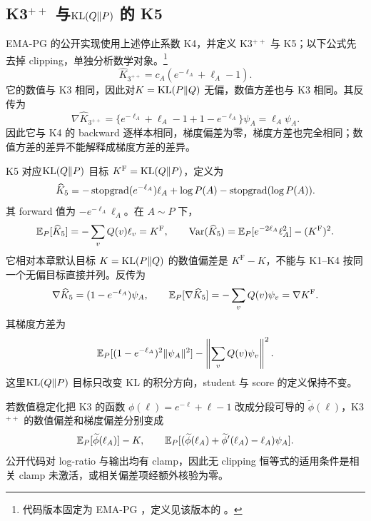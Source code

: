 \subsection{K3$^{++}$ 与$\operatorname{KL}(Q\Vert P)$ 的 K5}

EMA-PG 的公开实现使用上述停止系数 K4，并定义 K3$^{++}$ 与 K5；以下公式先去掉 clipping，单独分析数学对象。\footnote{代码版本固定为 EMA-PG ，定义见该版本的 \href{https://github.com/LunjunZhang/ema-pg/blob/f9b977632ad948ce935432a517c22291bfaba562/search/verl/trainer/ppo/core_algos.py}{}。}
\begin{equation*}
 \widehat K_{3^{++}}=c_A(e^{-\ell_A}+\ell_A-1).
\end{equation*}
它的数值与 K3 相同，因此对$K=\operatorname{KL}(P\Vert Q)$ 无偏，数值方差也与 K3 相同。其反传为
\begin{equation*}
 \nabla\widehat K_{3^{++}}
 =\{e^{-\ell_A}+\ell_A-1+1-e^{-\ell_A}\}\psi_A=\ell_A\psi_A.
\end{equation*}
因此它与 K4 的 backward 逐样本相同，梯度偏差为零，梯度方差也完全相同；数值方差的差异不能解释成梯度方差的差异。

K5 对应$\operatorname{KL}(Q\Vert P)$ 目标 $K^{\mathrm F}=\operatorname{KL}(Q\Vert P)$，定义为
\begin{equation*}
 \widehat K_5=-\operatorname{stopgrad}(e^{-\ell_A})\ell_A+\log P(A)-\operatorname{stopgrad}(\log P(A)).
\end{equation*}
其 forward 值为 $-e^{-\ell_A}\ell_A$。在 $A\sim P$ 下，
\begin{equation*}
 \mathbb E_P[\widehat K_5]=-\sum_vQ(v)\ell_v=K^{\mathrm F},\qquad
 \operatorname{Var}(\widehat K_5)=\mathbb E_P[e^{-2\ell_A}\ell_A^2]-(K^{\mathrm F})^2.
\end{equation*}
它相对本章默认目标 $K=\operatorname{KL}(P\Vert Q)$ 的数值偏差是 $K^{\mathrm F}-K$，不能与 K1--K4 按同一个无偏目标直接并列。反传为
\begin{equation*}
 \nabla\widehat K_5=(1-e^{-\ell_A})\psi_A,\qquad
 \mathbb E_P[\nabla\widehat K_5]=-\sum_vQ(v)\psi_v=\nabla K^{\mathrm F}.
\end{equation*}
其梯度方差为
\begin{equation*}
 \mathbb E_P[(1-e^{-\ell_A})^2\lVert \psi_A\rVert^2]
 -\left\lVert\sum_vQ(v)\psi_v\right\rVert^2.
\end{equation*}
这里$\operatorname{KL}(Q\Vert P)$ 目标只改变 KL 的积分方向，student 与 score 的定义保持不变。

若数值稳定化把 K3 的函数 $\phi(\ell)=e^{-\ell}+\ell-1$ 改成分段可导的 $\widetilde\phi(\ell)$，K3$^{++}$ 的数值偏差和梯度偏差分别变成
\begin{equation*}
 \mathbb E_P[\widetilde\phi(\ell_A)]-K,\qquad
 \mathbb E_P[(\widetilde\phi(\ell_A)+\widetilde\phi'(\ell_A)-\ell_A)\psi_A].
\end{equation*}
公开代码对 log-ratio 与输出均有 clamp，因此无 clipping 恒等式的适用条件是相关 clamp 未激活，或相关偏差项经额外核验为零。

